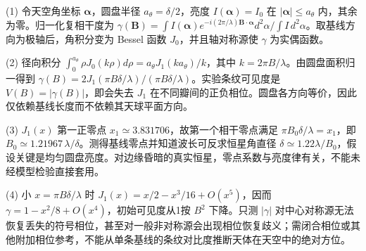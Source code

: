 (1) 令天空角坐标 \(\boldsymbol\alpha\)，圆盘半径 \(a_\theta=\delta/2\)，亮度 \(I(\boldsymbol\alpha)=I_0\) 在 \(|\boldsymbol\alpha|\le a_\theta\) 内，其余为零。归一化复相干度为 \(\gamma(\boldsymbol B)=\int I(\boldsymbol\alpha)e^{-i(2\pi/\lambda)\boldsymbol B\cdot\boldsymbol\alpha}d^2\alpha/\int I\,d^2\alpha\)。取基线方向为极轴后，角积分变为 Bessel 函数 \(J_0\)，并且轴对称源使 \(\gamma\) 为实偶函数。

(2) 径向积分 \(\int_0^{a_\theta}\rho J_0(k\rho)d\rho=a_\theta J_1(ka_\theta)/k\)，其中 \(k=2\pi B/\lambda\)。由圆盘面积归一得到 \(\gamma(B)=2J_1(\pi B\delta/\lambda)/(\pi B\delta/\lambda)\)。实验条纹可见度是 \(V(B)=|\gamma(B)|\)，即会失去 \(J_1\) 在不同瓣间的正负相位。圆盘各方向等价，因此仅依赖基线长度而不依赖其天球平面方向。

(3) \(J_1(x)\) 第一正零点 \(x_1\simeq3.831706\)，故第一个相干零点满足 \(\pi B_0\delta/\lambda=x_1\)，即 \(B_0\simeq1.21967\,\lambda/\delta\)。测得基线零点并知道波长可反求恒星角直径 \(\delta\simeq1.22\lambda/B_0\)，假设关键是均匀圆盘亮度。对边缘昏暗的真实恒星，零点系数与亮度律有关，不能未经模型检验直接套用。

(4) 小 \(x=\pi B\delta/\lambda\) 时 \(J_1(x)=x/2-x^3/16+O(x^5)\)，因而 \(\gamma=1-x^2/8+O(x^4)\)，初始可见度从1按 \(B^2\) 下降。只测 \(|\gamma|\) 对中心对称源无法恢复丢失的符号相位，甚至对一般非对称源会出现相位恢复歧义；需闭合相位或其他附加相位参考，不能从单条基线的条纹对比度推断天体在天空中的绝对方位。
